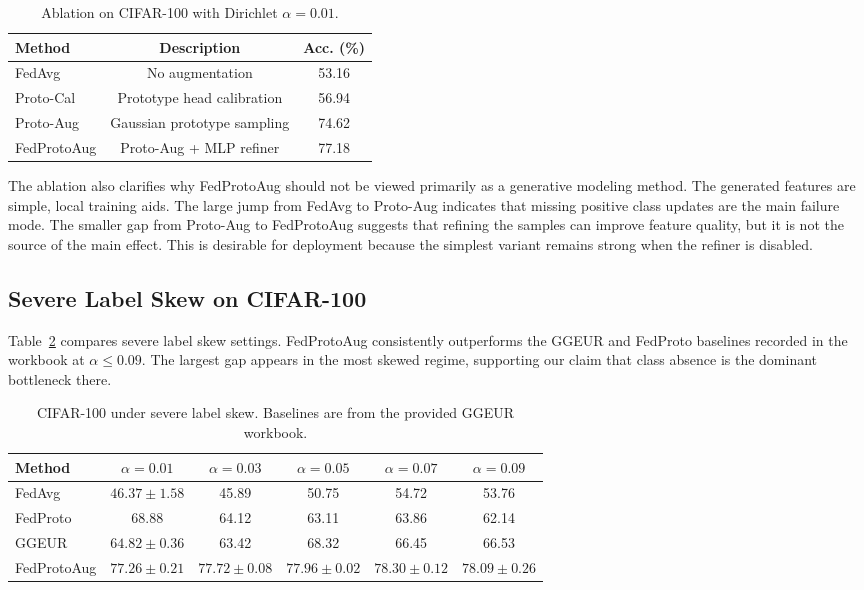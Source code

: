 ﻿\documentclass[conference]{IEEEtran}
\newcommand{\method}{FedProtoAug}
\begin{document}
\begin{table}[t]
\centering
\caption{Ablation on CIFAR-100 with Dirichlet $\alpha = 0.01$.}
\label{tab:ablation}
\begin{tabular}{lcc}
\toprule
Method & Description & Acc. (\%) \\
\midrule
FedAvg & No augmentation & 53.16 \\
Proto-Cal & Prototype head calibration & 56.94 \\
Proto-Aug & Gaussian prototype sampling & 74.62 \\
\method{} & Proto-Aug + MLP refiner & 77.18 \\
\bottomrule
\end{tabular}
\end{table}

The ablation also clarifies why \method{} should not be viewed primarily as a generative modeling method. The generated features are simple, local training aids. The large jump from FedAvg to Proto-Aug indicates that missing positive class updates are the main failure mode. The smaller gap from Proto-Aug to \method{} suggests that refining the samples can improve feature quality, but it is not the source of the main effect. This is desirable for deployment because the simplest variant remains strong when the refiner is disabled.

\subsection{Severe Label Skew on CIFAR-100}
Table~\ref{tab:cifar100_severe} compares severe label skew settings. \method{} consistently outperforms the GGEUR and FedProto baselines recorded in the workbook at $\alpha\le0.09$. The largest gap appears in the most skewed regime, supporting our claim that class absence is the dominant bottleneck there.

\begin{table}[t]
\centering
\caption{CIFAR-100 under severe label skew. Baselines are from the provided GGEUR workbook.}
\label{tab:cifar100_severe}
\begin{tabular}{lccccc}
\toprule
Method & $\alpha = 0.01$ & $\alpha = 0.03$ & $\alpha = 0.05$ & $\alpha = 0.07$ & $\alpha = 0.09$ \\
\midrule
FedAvg & $46.37\pm1.58$ & 45.89 & 50.75 & 54.72 & 53.76 \\
FedProto & 68.88 & 64.12 & 63.11 & 63.86 & 62.14 \\
GGEUR & $64.82\pm0.36$ & 63.42 & 68.32 & 66.45 & 66.53 \\
\method{} & $77.26\pm0.21$ & $77.72\pm0.08$ & $77.96\pm0.02$ & $78.30\pm0.12$ & $78.09\pm0.26$ \\
\bottomrule
\end{tabular}
\end{table}
\end{document}
